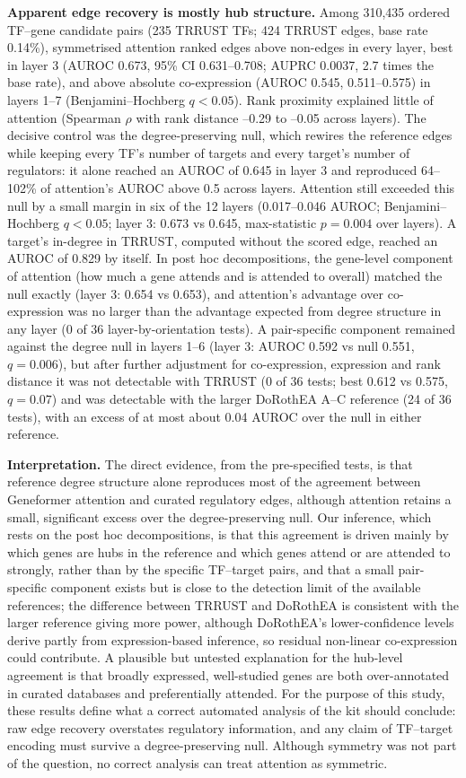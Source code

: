 \textbf{Apparent edge recovery is mostly hub structure.} Among 310,435 ordered TF--gene candidate pairs (235 TRRUST TFs; 424 TRRUST edges, base rate 0.14\%), symmetrised attention ranked edges above non-edges in every layer, best in layer 3 (AUROC 0.673, 95\% CI 0.631--0.708; AUPRC 0.0037, 2.7 times the base rate), and above absolute co-expression (AUROC 0.545, 0.511--0.575) in layers 1--7 (Benjamini--Hochberg $q<0.05$). Rank proximity explained little of attention (Spearman $\rho$ with rank distance --0.29 to --0.05 across layers). The decisive control was the degree-preserving null, which rewires the reference edges while keeping every TF's number of targets and every target's number of regulators: it alone reached an AUROC of 0.645 in layer 3 and reproduced 64--102\% of attention's AUROC above 0.5 across layers. Attention still exceeded this null by a small margin in six of the 12 layers (0.017--0.046 AUROC; Benjamini--Hochberg $q<0.05$; layer 3: 0.673 vs 0.645, max-statistic $p=0.004$ over layers). A target's in-degree in TRRUST, computed without the scored edge, reached an AUROC of 0.829 by itself. In post hoc decompositions, the gene-level component of attention (how much a gene attends and is attended to overall) matched the null exactly (layer 3: 0.654 vs 0.653), and attention's advantage over co-expression was no larger than the advantage expected from degree structure in any layer (0 of 36 layer-by-orientation tests). A pair-specific component remained against the degree null in layers 1--6 (layer 3: AUROC 0.592 vs null 0.551, $q=0.006$), but after further adjustment for co-expression, expression and rank distance it was not detectable with TRRUST (0 of 36 tests; best 0.612 vs 0.575, $q=0.07$) and was detectable with the larger DoRothEA A--C reference (24 of 36 tests), with an excess of at most about 0.04 AUROC over the null in either reference.

\textbf{Interpretation.} The direct evidence, from the pre-specified tests, is that reference degree structure alone reproduces most of the agreement between Geneformer attention and curated regulatory edges, although attention retains a small, significant excess over the degree-preserving null. Our inference, which rests on the post hoc decompositions, is that this agreement is driven mainly by which genes are hubs in the reference and which genes attend or are attended to strongly, rather than by the specific TF--target pairs, and that a small pair-specific component exists but is close to the detection limit of the available references; the difference between TRRUST and DoRothEA is consistent with the larger reference giving more power, although DoRothEA's lower-confidence levels derive partly from expression-based inference, so residual non-linear co-expression could contribute. A plausible but untested explanation for the hub-level agreement is that broadly expressed, well-studied genes are both over-annotated in curated databases and preferentially attended. For the purpose of this study, these results define what a correct automated analysis of the kit should conclude: raw edge recovery overstates regulatory information, and any claim of TF--target encoding must survive a degree-preserving null. Although symmetry was not part of the question, no correct analysis can treat attention as symmetric.
